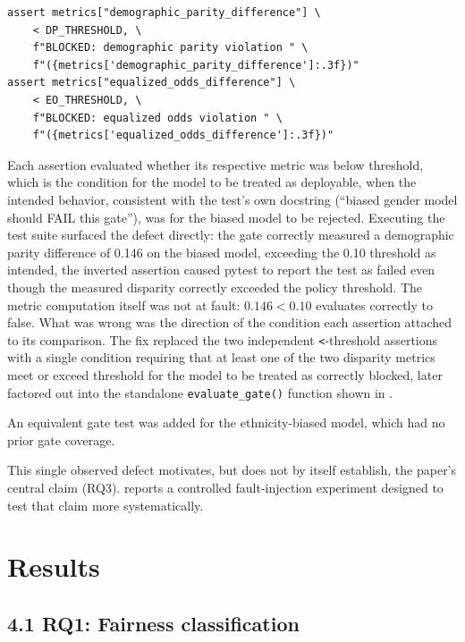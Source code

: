 \documentclass[]{einformatica}
\newenvironment{code}{\captionsetup{type=listing}}{}
\begin{document}
\begin{code}
\caption{The original, defective inline assertions}
\label{listing:defect}
\begin{verbatim}
assert metrics["demographic_parity_difference"] \
    < DP_THRESHOLD, \
    f"BLOCKED: demographic parity violation " \
    f"({metrics['demographic_parity_difference']:.3f})"
assert metrics["equalized_odds_difference"] \
    < EO_THRESHOLD, \
    f"BLOCKED: equalized odds violation " \
    f"({metrics['equalized_odds_difference']:.3f})"
\end{verbatim}
\end{code}

Each assertion evaluated whether its respective metric was below threshold, which is the condition for the model to be treated as deployable, when the intended behavior, consistent with the test's own docstring (``biased gender model should FAIL this gate''), was for the biased model to be rejected. Executing the test suite surfaced the defect directly: the gate correctly measured a demographic parity difference of 0.146 on the biased model, exceeding the 0.10 threshold as intended, the inverted assertion caused pytest to report the test as failed even though the measured disparity correctly exceeded the policy threshold. The metric computation itself was not at fault: $0.146 < 0.10$ evaluates correctly to false. What was wrong was the direction of the condition each assertion attached to its comparison. The fix replaced the two independent \texttt{<}-threshold assertions with a single condition requiring that at least one of the two disparity metrics meet or exceed threshold for the model to be treated as correctly blocked, later factored out into the standalone \texttt{evaluate\_gate()} function shown in .

An equivalent gate test was added for the ethnicity-biased model, which had no prior gate coverage.

This single observed defect motivates, but does not by itself establish, the paper's central claim (RQ3).  reports a controlled fault-injection experiment designed to test that claim more systematically.

\section{Results}\label{sec:Results}

\subsection*{4.1 RQ1: Fairness classification}\label{sec:Results-RQ1}
\end{document}
